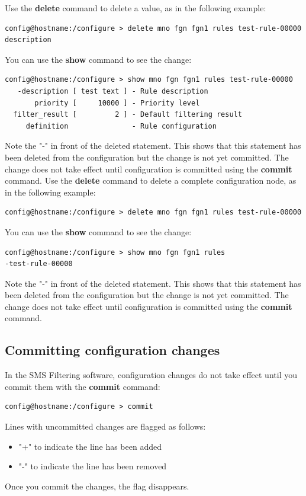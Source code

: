 \documentclass[a4paper,latin]{paper}
\begin{document}
Use the \textbf{delete} command to delete a value, as in the following example:
\begin{lstlisting}[style=BashInputStyle]
config@hostname:/configure > delete mno fgn fgn1 rules test-rule-00000 description
\end{lstlisting}
You can use the \textbf{show} command to see the change:
\begin{lstlisting}[style=BashInputStyle]
config@hostname:/configure > show mno fgn fgn1 rules test-rule-00000
   -description [ test text ] - Rule description
       priority [     10000 ] - Priority level  
  filter_result [         2 ] - Default filtering result
     definition               - Rule configuration
\end{lstlisting}
Note the "-" in front of the deleted statement. This shows that this statement has been
deleted from the configuration but the change is not yet committed. The change does not
take effect until configuration is committed using the \textbf{commit} command.\newline\newline
Use the \textbf{delete} command to delete a complete configuration node, as in the following
example:
\begin{lstlisting}[style=BashInputStyle]
config@hostname:/configure > delete mno fgn fgn1 rules test-rule-00000
\end{lstlisting}
You can use the \textbf{show} command to see the change:
\begin{lstlisting}[style=BashInputStyle]
config@hostname:/configure > show mno fgn fgn1 rules
-test-rule-00000
\end{lstlisting}
Note the "-" in front of the deleted statement. This shows that this statement has been
deleted from the configuration but the change is not yet committed. The change does not
take effect until configuration is committed using the \textbf{commit} command.

\subsection{Committing configuration changes}

In the SMS Filtering software, configuration changes do not take effect until you commit them with
the \textbf{commit} command:
\begin{lstlisting}[style=BashInputStyle]
config@hostname:/configure > commit
\end{lstlisting}
Lines with uncommitted changes are flagged as follows:
\begin{itemize}
	\item "+" to indicate the line has been added
	\item "-" to indicate the line has been removed
\end{itemize}
Once you commit the changes, the flag disappears.
\end{document}
